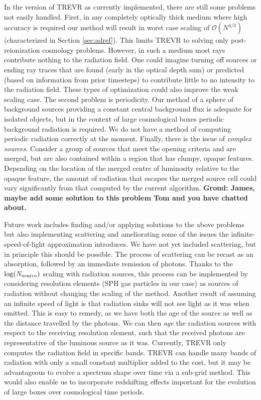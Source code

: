 \documentclass[fleq,usenatbib]{mnras}
\newcommand{\acro}{TREVR}
\newcommand{\bigO}[1]{\mathcal{O}\left(#1\right)}
\newcommand{\comment}[1]{\textbf{\color{red}#1}}
\newcommand{\NS}{N_{\rm source}}
\begin{document}
{In the version of \acro{} as currently implemented, there are still some 
problems not easily handled. First, in any completely optically thick 
medium where high accuracy is required our method will result in worst 
case scaling of $\bigO{N^{4/3}}$ (characterized in Section \ref{sec:adref}). 
This limits \acro{} to solving only post-reionization cosmology problems. 
However, in such a medium most rays contribute nothing to the radiation field. 
One could imagine turning off sources or ending ray traces that are found 
(early in the optical depth sum) or predicted (based on information from prior 
timesteps) to contribute little to no intensity to the radiation field. These 
types of optimization could also improve the weak scaling case. The second 
problem is periodicity. Our method of a sphere of background sources providing 
a constant central background flux is adequate for isolated objects, but in 
the context of large cosmological boxes periodic background radiation is 
required. We do not have a method of computing periodic radiation correctly 
at the moment. Finally, there is the issue of \textit{complex sources}. 
Consider a group of sources that meet the opening criteria and are merged, 
but are also contained within a region that has clumpy, opaque features. 
Depending on the location of the merged centre of luminosity relative to the 
opaque feature, the amount of radiation that escapes the merged source cell 
could vary significantly from that computed by the current algorithm. 
\comment{Grond: James, maybe add some solution to this problem Tom and you 
have chatted about.}

Future work includes finding and/or applying solutions to the above problems 
but also implementing scattering and ameliorating some of the issues the 
infinite-speed-of-light approximation introduces. We have not yet included 
scattering, but in principle this should be possible. The process of 
scattering can be recast as an absorption, followed by an immediate remission 
of photons. Thanks to the $\log(\NS)$ scaling with radiation sources, this 
process can be implemented by considering resolution elements (SPH gas 
particles in our case) as sources of radiation without changing the scaling of 
the method. Another result of assuming an infinite speed of light is that 
radiation sinks will not see light as it was when emitted. This is easy to 
remedy, as we have both the age of the source as well as the distance 
travelled by the photons. We can then \textit{age} the radiation sources with 
respect to the receiving resolution element, such that the received photons 
are representative of the luminous source as it was. Currently, \acro{} only 
computes the radiation field in specific bands. \acro{} can handle many bands 
of radiation with only a small constant multiplier added to the cost, but it 
may be advantageous to evolve a spectrum shape over time via a sub-grid 
method. This would also enable us to incorporate redshifting effects important 
for the evolution of large boxes over cosmological time periods.

}
\end{document}
